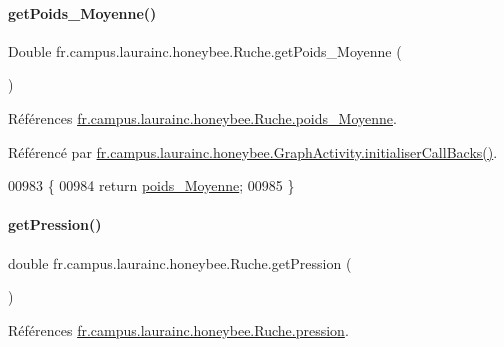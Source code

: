 \paragraph{\texorpdfstring{get\+Poids\+\_\+\+Moyenne()}{getPoids\_Moyenne()}}
{\footnotesize\ttfamily Double fr.\+campus.\+laurainc.\+honeybee.\+Ruche.\+get\+Poids\+\_\+\+Moyenne (\begin{DoxyParamCaption}{ }\end{DoxyParamCaption})}



Références \hyperlink{classfr_1_1campus_1_1laurainc_1_1honeybee_1_1_ruche_a972036ada9b7e6b927d354c37351a41b}{fr.\+campus.\+laurainc.\+honeybee.\+Ruche.\+poids\+\_\+\+Moyenne}.



Référencé par \hyperlink{classfr_1_1campus_1_1laurainc_1_1honeybee_1_1_graph_activity_a8dc56c3e0744bcb9295ad10e726b5fdb}{fr.\+campus.\+laurainc.\+honeybee.\+Graph\+Activity.\+initialiser\+Call\+Backs()}.


\begin{DoxyCode}
00983                                      \{
00984         \textcolor{keywordflow}{return} \hyperlink{classfr_1_1campus_1_1laurainc_1_1honeybee_1_1_ruche_a972036ada9b7e6b927d354c37351a41b}{poids\_Moyenne};
00985     \}
\end{DoxyCode}
\mbox{\label{classfr_1_1campus_1_1laurainc_1_1honeybee_1_1_ruche_a9d94748ece29463c420e93e0e7aa7acd}} 
\paragraph{\texorpdfstring{get\+Pression()}{getPression()}}
{\footnotesize\ttfamily double fr.\+campus.\+laurainc.\+honeybee.\+Ruche.\+get\+Pression (\begin{DoxyParamCaption}{ }\end{DoxyParamCaption})}



Références \hyperlink{classfr_1_1campus_1_1laurainc_1_1honeybee_1_1_ruche_a73ddf7686cdd056fe7dc4b249f6ada86}{fr.\+campus.\+laurainc.\+honeybee.\+Ruche.\+pression}.




